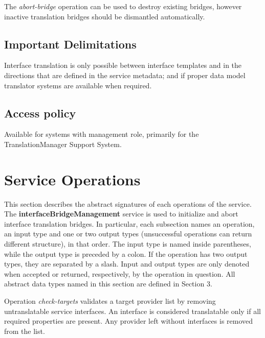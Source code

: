 \documentclass[a4paper]{arrowhead}
\begin{document}
The \textit{abort-bridge} operation can be used to destroy existing bridges, however inactive translation bridges should be dismantled automatically.

\subsection{Important Delimitations}
\label{sec:delimitations}

Interface translation is only possible between interface templates and in the directions that are defined in the service metadata; and if proper data model translator systems are available when required.  

\subsection{Access policy}
\label{sec:accesspolicy}

Available for systems with management role, primarily for the TranslationManager Support System.

\newpage

\section{Service Operations}
\label{sec:functions}

This section describes the abstract signatures of each operations of the service. The \textbf{interfaceBridgeManagement} service is used to initialize and abort interface translation bridges.
In particular, each subsection names an operation, an input type and one or two output types (unsuccessful operations can return different structure), in that order.
The input type is named inside parentheses, while the output type is preceded by a colon. If the operation has two output types, they are separated by a slash.
Input and output types are only denoted when accepted or returned, respectively, by the operation in question. All abstract data types named in this section are defined in Section 3.

{}

Operation \textit{check-targets} validates a target provider list by removing untranslatable service interfaces. An interface is considered translatable only if all required properties are present. Any provider left without interfaces is removed from the list.
\end{document}
